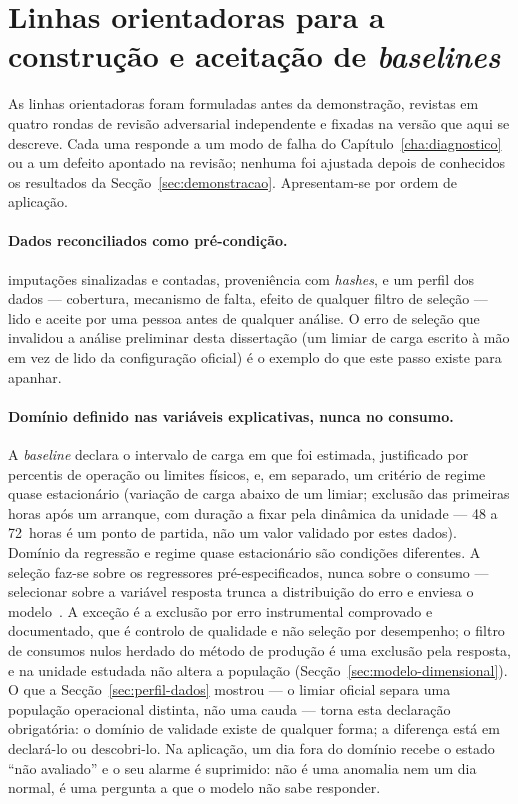 \section{Linhas orientadoras para a construção e aceitação de \emph{baselines}}
\label{sec:guidelines}

As linhas orientadoras foram formuladas antes da demonstração, revistas em
quatro rondas de revisão adversarial independente
e fixadas na versão que aqui se descreve. Cada uma responde a um modo de
falha do Capítulo~\ref{cha:diagnostico} ou a um defeito apontado na revisão;
nenhuma foi ajustada depois de conhecidos os resultados da
Secção~\ref{sec:demonstracao}. Apresentam-se por ordem de aplicação.

\paragraph{Dados reconciliados como pré-condição.}  imputações sinalizadas e contadas,
proveniência com \emph{hashes}, e um perfil dos dados --- cobertura,
mecanismo de falta, efeito de qualquer filtro de seleção --- lido e aceite
por uma pessoa antes de qualquer análise. O erro de seleção que invalidou a
análise preliminar desta dissertação (um limiar de carga escrito à mão em vez
de lido da configuração oficial) é o exemplo do que este passo existe para
apanhar.

\paragraph{Domínio definido nas variáveis explicativas, nunca no consumo.} A
\emph{baseline} declara o intervalo de carga em que foi estimada, justificado
por percentis de operação ou limites físicos, e, em separado, um critério de regime
quase estacionário (variação de carga abaixo de um limiar; exclusão das
primeiras horas após um arranque, com duração a fixar pela dinâmica da
unidade --- 48 a 72~horas é um ponto de partida, não um valor validado por
estes dados). Domínio da regressão e regime quase estacionário são condições
diferentes. A seleção faz-se sobre os regressores pré-especificados, nunca
sobre o consumo --- selecionar sobre a variável resposta trunca a
distribuição do erro e enviesa o modelo~\cite{Heckman1979}. A exceção é a
exclusão por erro instrumental comprovado e documentado, que é controlo de
qualidade e não seleção por desempenho; o filtro de consumos nulos herdado
do método de produção é uma exclusão pela resposta, e na unidade estudada
não altera a população (Secção~\ref{sec:modelo-dimensional}). O que a
Secção~\ref{sec:perfil-dados} mostrou --- o limiar oficial separa uma
população operacional distinta, não uma cauda --- torna esta declaração
obrigatória: o domínio de validade existe de qualquer forma; a diferença
está em declará-lo ou descobri-lo. Na aplicação, um dia fora do domínio
recebe o estado ``não avaliado'' e o seu alarme é suprimido: não é uma
anomalia nem um dia normal, é uma pergunta a que o modelo não sabe
responder.

